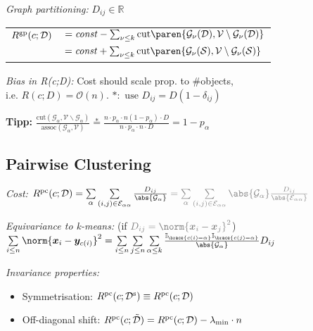 \emph{Graph partitioning:}
\quad $D_{ij} \in \mathbb R$\\
\begin{tabular}{@{} l @{} l @{}}
    $R^\mathrm{gp} (c; \mathcal D)$ &
        $= \mathit{const} - \sum_{\nu\leq k} \mathrm{cut} \paren{ \mathcal G_\nu (\mathcal D), \mathcal V \setminus \mathcal G_\nu (\mathcal D) }$
    \\ &
        $= \mathit{const} + \sum_{\nu\leq k} \mathrm{cut} \paren{ \mathcal G_\nu (\mathcal S), \mathcal V \setminus \mathcal G_\nu (\mathcal S) }$
\end{tabular}

\emph{Bias in \textit{\rmfamily R(c;D)}:}\enspace
Cost should scale prop. to \#objects,\\
i.e. $R(c;D) = \mathcal O(n)$.
\qquad $\ast: \text{ use } D_{ij} = D(1 - \delta_{ij})$

\textbf{Tipp:}\enspace
$\frac{\mathrm{cut}(\mathcal G_\alpha, \mathcal V \backslash \mathcal G_\alpha)}{\mathrm{assoc}(\mathcal G_\alpha, \mathcal V)}
\overset\ast= \frac{n\cdot p_\alpha \cdot n(1-p_\alpha) \cdot D}{n\cdot p_\alpha \cdot n \cdot D} = 1 - p_\alpha$

\subsection{Pairwise Clustering}

\emph{Cost:}\enspace
$R\ap{pc} (c; \mathcal D)
= \sum\limits_\alpha \sum\limits_{(i,j) \in \mathcal E_{\alpha\alpha}} \frac{D_{ij}}{\abs{\mathcal G_\alpha}}
\color{gray}
= \sum\limits_\alpha \sum\limits_{(i,j) \in \mathcal E_{\alpha\alpha}} \abs{\mathcal G_\alpha} \frac{D_{ij}}{\abs{\mathcal E_{\alpha\alpha}}}$

\emph{Equivariance to \textit{\rmfamily k}-means:}
{\small\color{gray}\quad(if $\color{gray} D_{ij} = \norm{\bm x_i - \bm x_j}^2$)}\\
$\sum\limits_{i\leq n} \norm{\bm x_i - \bm y_{c(i)}}^2 = \sum\limits_{i\leq n} \sum\limits_{j\leq n} \sum\limits_{\alpha\leq k} \frac{\mathbb I_{\brace{c(i) = \alpha}} \mathbb I_{\brace{c(j) = \alpha}}}{\abs{\mathcal G_\alpha}} D_{ij}$


\emph{Invariance properties:}\\
\begin{itemize}
    \item Symmetrisation:
        \enskip $R^\mathrm{pc} (c; \mathcal D^\mathrm{s}) \equiv R^\mathrm{pc} (c; \mathcal D)$
    \item Off-diagonal shift:
        \enskip $R^\mathrm{pc} (c; \tilde{\mathcal D}) = R^\mathrm{pc} (c; \mathcal D) - \lambda_\mathrm{min}\cdot n$
\end{itemize}

